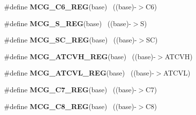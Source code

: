 \begin{DoxyCompactItemize}
\item 
\hypertarget{group___m_c_g___register___accessor___macros_gadbc313b8733938cb5efd4ffa9050d84b}{}\#define {\bfseries M\+C\+G\+\_\+\+C6\+\_\+\+R\+E\+G}(base)                                              ~((base)-\/$>$C6)\label{group___m_c_g___register___accessor___macros_gadbc313b8733938cb5efd4ffa9050d84b}

\item 
\hypertarget{group___m_c_g___register___accessor___macros_ga69f3bd6d5a19734d5e76e9948464eb7b}{}\#define {\bfseries M\+C\+G\+\_\+\+S\+\_\+\+R\+E\+G}(base)                                                ~((base)-\/$>$S)\label{group___m_c_g___register___accessor___macros_ga69f3bd6d5a19734d5e76e9948464eb7b}

\item 
\hypertarget{group___m_c_g___register___accessor___macros_ga5ac33230f450775fe7f50243d3c6daaf}{}\#define {\bfseries M\+C\+G\+\_\+\+S\+C\+\_\+\+R\+E\+G}(base)                                              ~((base)-\/$>$S\+C)\label{group___m_c_g___register___accessor___macros_ga5ac33230f450775fe7f50243d3c6daaf}

\item 
\hypertarget{group___m_c_g___register___accessor___macros_gad874adcb4ac61be011c975d1e0441273}{}\#define {\bfseries M\+C\+G\+\_\+\+A\+T\+C\+V\+H\+\_\+\+R\+E\+G}(base)                                        ~((base)-\/$>$A\+T\+C\+V\+H)\label{group___m_c_g___register___accessor___macros_gad874adcb4ac61be011c975d1e0441273}

\item 
\hypertarget{group___m_c_g___register___accessor___macros_ga474ad360067826ccee78bcec3713b1d2}{}\#define {\bfseries M\+C\+G\+\_\+\+A\+T\+C\+V\+L\+\_\+\+R\+E\+G}(base)                                        ~((base)-\/$>$A\+T\+C\+V\+L)\label{group___m_c_g___register___accessor___macros_ga474ad360067826ccee78bcec3713b1d2}

\item 
\hypertarget{group___m_c_g___register___accessor___macros_ga305ccd258608317dc3800156b312ff65}{}\#define {\bfseries M\+C\+G\+\_\+\+C7\+\_\+\+R\+E\+G}(base)                                              ~((base)-\/$>$C7)\label{group___m_c_g___register___accessor___macros_ga305ccd258608317dc3800156b312ff65}

\item 
\hypertarget{group___m_c_g___register___accessor___macros_gabd2e261bd5f2bddbbed7e076eaf90dee}{}\#define {\bfseries M\+C\+G\+\_\+\+C8\+\_\+\+R\+E\+G}(base)                                              ~((base)-\/$>$C8)\label{group___m_c_g___register___accessor___macros_gabd2e261bd5f2bddbbed7e076eaf90dee}


\end{DoxyCompactItemize}
